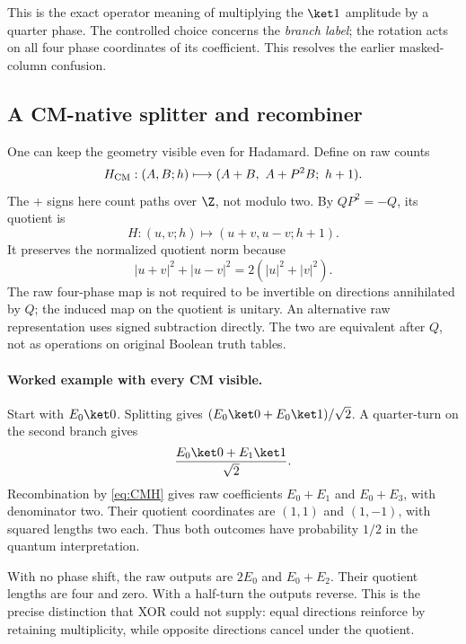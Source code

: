 This is the exact operator meaning of multiplying the $\ket1$ amplitude by a quarter phase. The controlled choice concerns the \emph{branch label}; the rotation acts on all four phase coordinates of its coefficient. This resolves the earlier masked-column confusion.

\subsection{A CM-native splitter and recombiner}
One can keep the geometry visible even for Hadamard. Define on raw counts
\begin{equation}\label{eq:CMH}
 H_{\rm CM}:(A,B;h)\longmapsto(A+B,\ A+P^2B;\ h+1).
\end{equation}
The $+$ signs here count paths over $\Z$, not modulo two. By $QP^2=-Q$, its quotient is
\begin{equation}
 H:(u,v;h)\longmapsto(u+v,u-v;h+1).
\end{equation}
It preserves the normalized quotient norm because
\begin{equation}
 |u+v|^2+|u-v|^2=2(|u|^2+|v|^2).
\end{equation}
The raw four-phase map is not required to be invertible on directions annihilated by $Q$; the induced map on the quotient is unitary. An alternative raw representation uses signed subtraction directly. The two are equivalent after $Q$, not as operations on original Boolean truth tables.

\paragraph{Worked example with every CM visible.}
Start with $E_0\ket0$. Splitting gives $(E_0\ket0+E_0\ket1)/\sqrt2$. A quarter-turn on the second branch gives
\begin{equation}
 \frac{E_0\ket0+E_1\ket1}{\sqrt2}.
\end{equation}
Recombination by \cref{eq:CMH} gives raw coefficients $E_0+E_1$ and $E_0+E_3$, with denominator two. Their quotient coordinates are $(1,1)$ and $(1,-1)$, with squared lengths two each. Thus both outcomes have probability $1/2$ in the quantum interpretation.

With no phase shift, the raw outputs are $2E_0$ and $E_0+E_2$. Their quotient lengths are four and zero. With a half-turn the outputs reverse. This is the precise distinction that XOR could not supply: equal directions reinforce by retaining multiplicity, while opposite directions cancel under the quotient.

